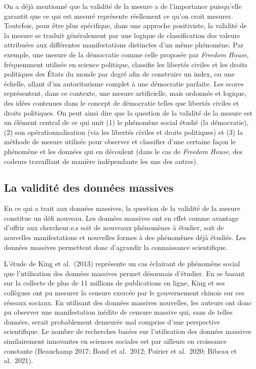 \documentclass[
  letterpaper,
  DIV=11,
  numbers=noendperiod]{scrreprt}
\begin{document}
On a déjà mentionné que la validité de la mesure a de l'importance
puisqu'elle garantit que ce qui est mesuré représente réellement ce
qu'on croit mesurer. Toutefois, pour être plus spécifique, dans une
approche positiviste, la validité de la mesure se traduit généralement
par une logique de classification des valeurs attribuées aux différentes
manifestations distinctes d'un même phénomène. Par exemple, une mesure
de la démocratie comme celle proposée par \emph{Freedom House},
fréquemment utilisée en science politique, classifie les libertés
civiles et les droits politiques des États du monde par degré afin de
construire un index, ou une échelle, allant d'un autoritarisme complet à
une démocratie parfaite. Les scores représentent, dans ce contexte, une
mesure artificielle, mais ordonnée et logique, des idées contenues dans
le concept de démocratie telles que libertés civiles et droits
politiques. On peut ainsi dire que la question de la validité de la
mesure est un élément central de ce qui unit (1) le phénomène social
étudié (la démocratie), (2) son opérationnalisation (via les libertés
civiles et droits politiques) et (3) la méthode de mesure utilisée pour
observer et classifier d'une certaine façon le phénomène et les données
qui en découlent (dans le cas de \emph{Freedom House}, des codeurs
travaillant de manière indépendante les uns des autres).

\hypertarget{la-validituxe9-des-donnuxe9es-massives}{%
\subsection*{La validité des données
massives}\label{la-validituxe9-des-donnuxe9es-massives}}

En ce qui a trait aux données massives, la question de la validité de la
mesure constitue un défi nouveau. Les données massives ont en effet
comme avantage d'offrir aux chercheur.e.s soit de nouveaux phénomènes à
étudier, soit de nouvelles manifestations et nouvelles formes à des
phénomènes déjà étudiés. Les données massives permettent donc d'agrandir
la connaissance scientifique.

L'étude de King et al.~(2013) représente un cas éclairant de phénomène
social que l'utilisation des données massives permet désormais
d'étudier. En se basant sur la collecte de plus de 11 millions de
publications en ligne, King et ses collègues ont pu mesurer la censure
exercée par le gouvernement chinois sur ces réseaux sociaux. En
utilisant des données massives nouvelles, les auteurs ont donc pu
observer une manifestation inédite de censure massive qui, sans de
telles données, serait probablement demeurée mal comprise d'une
perspective scientifique. Le nombre de recherches basées sur
l'utilisation des données massives similairement innovantes en sciences
sociales est par ailleurs en croissance constante (Beauchamp 2017; Bond
et al.~2012; Poirier et al.~2020; Bibeau et al.~2021).
\end{document}
